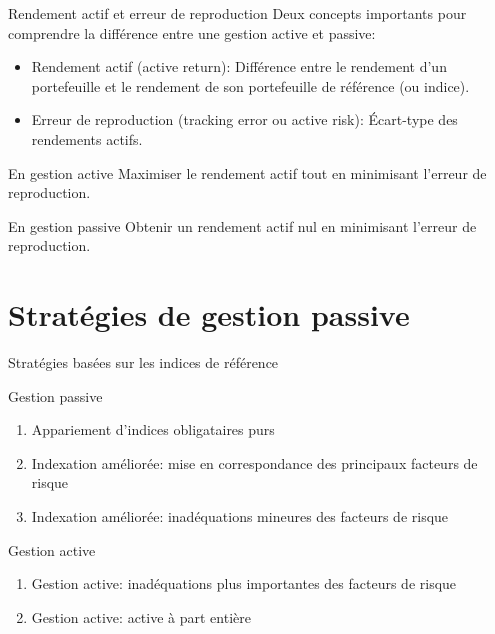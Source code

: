 \documentclass[10pt,a4paper]{beamer}
\begin{document}
\begin{frame}{Rendement actif et erreur de reproduction}
Deux concepts importants pour comprendre la différence entre une gestion active et passive: 
\begin{itemize}[label=\bullet]
\item Rendement actif (active return): Différence entre le rendement d’un portefeuille et le rendement de son portefeuille de référence (ou indice).
\item Erreur de reproduction (tracking error ou active risk): Écart-type des rendements actifs.  
\end{itemize}
\begin{block}{En gestion active}
Maximiser le rendement actif tout en minimisant l’erreur de reproduction.  
\end{block}

\begin{block}{En gestion passive}
Obtenir un rendement actif nul en minimisant l’erreur de reproduction.
\end{block}

\end{frame}

\section{Stratégies de gestion passive}
\begin{frame}{Stratégies basées sur les indices de référence}
\begin{block}{Gestion passive}
\begin{enumerate}[label=\arabic*)]
\item Appariement d'indices obligataires purs
\item Indexation améliorée: mise en correspondance des principaux facteurs de risque
\item Indexation améliorée: inadéquations mineures des facteurs de risque
\end{enumerate}
\end{block}
\begin{block}{Gestion active}
\begin{enumerate}[label=\arabic*)]
\item Gestion active: inadéquations plus importantes des facteurs de risque
\item Gestion active: active à part entière
\end{enumerate}
\end{block}
\end{frame}
\end{document}

